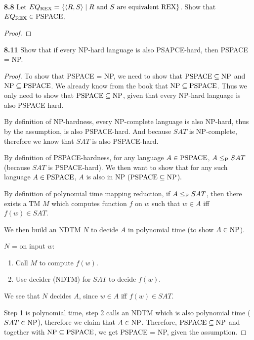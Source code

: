 \label{lang:EQREX_PSPACE}
\textbf{8.8} Let $EQ_\REX = \{ \desc{R, S} \mid \text{$R$ and $S$ are equivalent REX} \}$. Show that $EQ_\REX \in \PSPACE$.

\begin{mdframed}
\begin{proof}

\end{proof}
\end{mdframed}

\textbf{8.11} Show that if every NP-hard language is also PSAPCE-hard, then PSPACE = NP.
\begin{mdframed}
\begin{proof}
To show that PSPACE = NP, we need to show that $\PSPACE \subseteq \NP$ and $\NP \subseteq \PSPACE$. We already know from the book that $\NP \subseteq \PSPACE$. Thus we only need to show that $\PSPACE \subseteq \NP$, given that every NP-hard language is also PSPACE-hard.

By definition of NP-hardness, every NP-complete language is also NP-hard, thus by the assumption, is also PSPACE-hard. And because $SAT$ is NP-complete, therefore we know that $SAT$ is also PSPACE-hard. 

By definition of PSPACE-hardness, for any language $A \in \PSPACE$, $A \leq_\P SAT$ (because $SAT$ is PSPACE-hard). We then want to show that for any such language $A \in \PSPACE$, $A$ is also in NP ($\PSPACE \subseteq \NP$).

By definition of polynomial time mapping reduction, if $A \leq_\P SAT$, then there exists a TM $M$ which computes function $f$ on $w$ such that $w \in A$ iff $f(w) \in SAT$.

We then build an NDTM $N$ to decide $A$ in polynomial time (to show $A \in \NP$).

\medskip
$N$ = on input $w$:
\begin{enumerate}
\item Call $M$ to compute $f(w)$.
\item Use decider (NDTM) for $SAT$ to decide $f(w)$.
\end{enumerate}

We see that $N$ decides $A$, since $w \in A$ iff $f(w) \in SAT$.

Step 1 is polynomial time, step 2 calls an NDTM which is also polynomial time ($SAT \in \NP$), therefore we claim that $A \in \NP$. Therefore, $\PSPACE \subseteq \NP$ and together with $\NP \subseteq \PSPACE$, we get PSPACE = NP, given the assumption.
\end{proof}
\end{mdframed}

